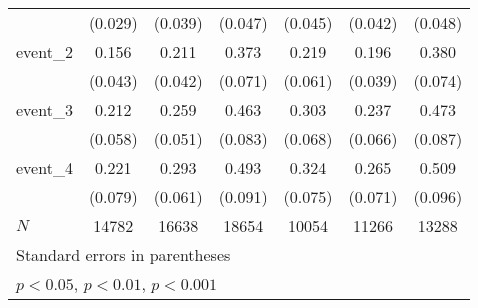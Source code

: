 {\begin{tabular}{l*{6}{c}}
            &     (0.029)         &     (0.039)         &     (0.047)         &     (0.045)         &     (0.042)         &     (0.048)         \\
[1em]
event\_2     &       0.156\sym{***}&       0.211\sym{***}&       0.373\sym{***}&       0.219\sym{***}&       0.196\sym{***}&       0.380\sym{***}\\
            &     (0.043)         &     (0.042)         &     (0.071)         &     (0.061)         &     (0.039)         &     (0.074)         \\
[1em]
event\_3     &       0.212\sym{***}&       0.259\sym{***}&       0.463\sym{***}&       0.303\sym{***}&       0.237\sym{***}&       0.473\sym{***}\\
            &     (0.058)         &     (0.051)         &     (0.083)         &     (0.068)         &     (0.066)         &     (0.087)         \\
[1em]
event\_4     &       0.221\sym{**} &       0.293\sym{***}&       0.493\sym{***}&       0.324\sym{***}&       0.265\sym{***}&       0.509\sym{***}\\
            &     (0.079)         &     (0.061)         &     (0.091)         &     (0.075)         &     (0.071)         &     (0.096)         \\
\hline
\(N\)       &       14782         &       16638         &       18654         &       10054         &       11266         &       13288         \\
\hline\hline
\multicolumn{7}{l}{\footnotesize Standard errors in parentheses}\\
\multicolumn{7}{l}{\footnotesize \sym{*} \(p<0.05\), \sym{**} \(p<0.01\), \sym{***} \(p<0.001\)}\\
\end{tabular}
}
